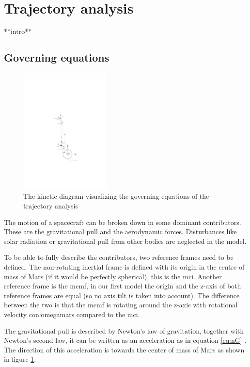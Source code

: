 \section{Trajectory analysis} \label{ch:trajectory}

**intro**

\subsection{Governing equations}\label{sec:gov}

\begin{figure}
		\centering
		\includegraphics[width = 0.4\textwidth]{Figure/orbital_mechanics.pdf}
		\caption{The kinetic diagram visualizing the governing equations of the trajectory analysis}
		\label{fig:orb}
\end{figure}

The motion of a spacecraft can be broken down in some dominant contributors. These are the gravitational pull and the aerodynamic forces. Disturbances like solar radiation or gravitational pull from other bodies are neglected in the model.

To be able to fully describe the contributors, two reference frames need to be defined. The non-rotating inertial frame is defined with its origin in the centre of mass of Mars (if it would be perfectly spherical), this is the \gls{mci}. 
Another reference frame is the \gls{mcmf}, in our first model the origin and the z-axis of both reference frames are equal (so no axis tilt is taken into account). The difference between the two is that the \gls{mcmf} is rotating around the z-axis with rotational velocity \gls{con:omegamars} compared to the \gls{mci}.

The gravitational pull is described by Newton's law of gravitation, together with Newton's second law, it can be written as an acceleration as in equation \ref{eq:nG} \cite{Weiland2004}. The direction of this acceleration is towards the center of mass of Mars as shown in figure \ref{fig:orb}.

